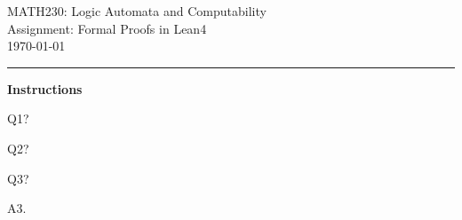 \documentclass[12pt,letterpaper, onecolumn]{exam}
\begin{document}
\begingroup  
    \centering
    \LARGE MATH230: Logic Automata and Computability\\
    \LARGE Assignment: Formal Proofs in Lean4\\[0.5em]
    \large \today\\[0.5em]
\endgroup
\rule{\textwidth}{0.4pt}
\pointsdroppedatright   %
\printanswers
\renewcommand{\solutiontitle}{\noindent\textbf{Ans:}\enspace}   %

\textbf{Instructions}

\begin{questions}

    \question[1 Mark] Q1?\droppoints
    
    
    \question[2 Marks] Q2?
    

    \pagebreak %
    
     Q3?\droppoints
    
    \begin{solution}
            A3.
    \end{solution}
    
\end{questions}
\end{document}
